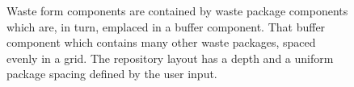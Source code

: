 
\begin{figure}[htbp!]
\begin{center}
\def\svgwidth{.5\textwidth}

\end{center}
\caption{Waste form components are contained by waste package components which are, in turn, emplaced in a buffer component. That buffer component which contains many other waste packages, spaced evenly in a grid.  The repository layout has a depth and a uniform package spacing defined by the user input.}
\label{fig:repo_layout}
\end{figure}
